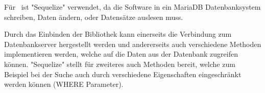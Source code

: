 
Für \ZELIA\ ist "Sequelize" verwendet, da die Software in ein MariaDB Datenbanksystem schreiben, Daten ändern, oder Datensätze auslesen muss.

Durch das Einbinden der Bibliothek kann einerseits die Verbindung zum Datenbankserver hergestellt werden und andererseits auch verschiedene Methoden implementieren werden, welche auf die Daten aus der Datenbank zugreifen können. "Sequelize" stellt für zweiteres auch Methoden bereit, welche zum Beispiel bei der Suche auch durch verschiedene Eigenschaften eingeschränkt werden können (WHERE Parameter).






